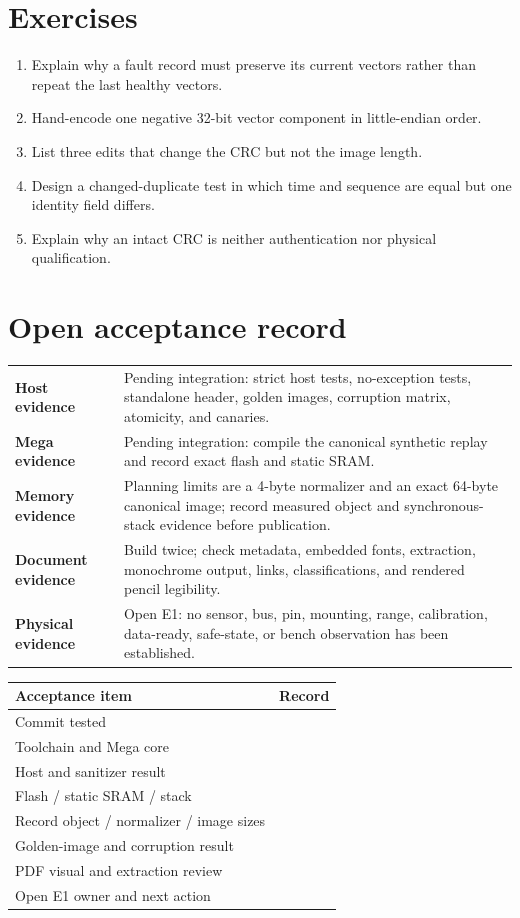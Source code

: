 \documentclass[10pt]{article}
\begin{document}
\section{Exercises}
\begin{enumerate}
 \item Explain why a fault record must preserve its current vectors rather
       than repeat the last healthy vectors.
 \item Hand-encode one negative 32-bit vector component in little-endian order.
 \item List three edits that change the CRC but not the image length.
 \item Design a changed-duplicate test in which time and sequence are equal but
       one identity field differs.
 \item Explain why an intact CRC is neither authentication nor physical
       qualification.
\end{enumerate}

\newpage
\section{Open acceptance record}
\begin{tabularx}{\linewidth}{@{}>{\bfseries}l X@{}}
Host evidence & Pending integration: strict host tests, no-exception tests,
standalone header, golden images, corruption matrix, atomicity, and canaries.\\
Mega evidence & Pending integration: compile the canonical synthetic replay
and record exact flash and static SRAM.\\
Memory evidence & Planning limits are a 4-byte normalizer and an exact 64-byte
canonical image; record measured object and synchronous-stack evidence before
publication.\\
Document evidence & Build twice; check metadata, embedded fonts, extraction,
monochrome output, links, classifications, and rendered pencil legibility.\\
Physical evidence & Open E1: no sensor, bus, pin, mounting, range, calibration,
data-ready, safe-state, or bench observation has been established.\\
\end{tabularx}

\vspace{8pt}
\begin{tabularx}{\linewidth}{@{}l X@{}}
\toprule
Acceptance item & Record\\
\midrule
Commit tested & \hrulefill\\[10pt]
Toolchain and Mega core & \hrulefill\\[10pt]
Host and sanitizer result & \hrulefill\\[10pt]
Flash / static SRAM / stack & \hrulefill\\[10pt]
Record object / normalizer / image sizes & \hrulefill\\[10pt]
Golden-image and corruption result & \hrulefill\\[10pt]
PDF visual and extraction review & \hrulefill\\[10pt]
Open E1 owner and next action & \hrulefill\\
\bottomrule
\end{tabularx}
\end{document}
